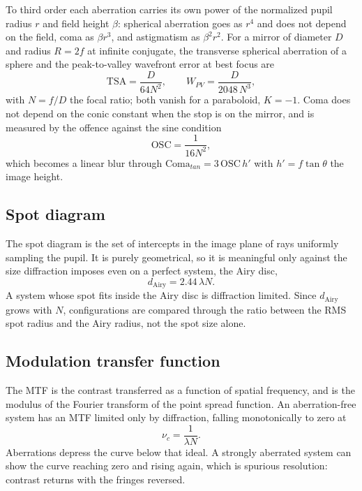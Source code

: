 \documentclass[conference]{IEEEtran}
\begin{document}
To third order each aberration carries its own power of the normalized pupil
radius $r$ and field height $\beta$: spherical aberration goes as $r^4$ and
does not depend on the field, coma as $\beta r^3$, and astigmatism as
$\beta^2r^2$. For a mirror of diameter $D$ and radius $R = 2f$ at infinite
conjugate, the transverse spherical aberration of a sphere and the
peak-to-valley wavefront error at best focus are
\begin{equation}
\mathrm{TSA} = \frac{D}{64N^2},
\qquad
W_{PV} = \frac{D}{2048\,N^3},
\label{eq:sa}
\end{equation}
with $N = f/D$ the focal ratio; both vanish for a paraboloid, $K = -1$. Coma
does not depend on the conic constant when the stop is on the mirror, and is
measured by the offence against the sine condition
\begin{equation}
\mathrm{OSC} = \frac{1}{16N^2},
\label{eq:osc}
\end{equation}
which becomes a linear blur through $\mathrm{Coma}_{tan} = 3\,\mathrm{OSC}\,h'$
with $h' = f\tan\theta$ the image height.

\subsection{Spot diagram}

The spot diagram is the set of intercepts in the image plane of rays
uniformly sampling the pupil. It is purely geometrical, so it is meaningful
only against the size diffraction imposes even on a perfect system, the Airy
disc,
\begin{equation}
d_{\mathrm{Airy}} = 2.44\,\lambda N.
\label{eq:airy}
\end{equation}
A system whose spot fits inside the Airy disc is diffraction limited. Since
$d_{\mathrm{Airy}}$ grows with $N$, configurations are compared through the
ratio between the RMS spot radius and the Airy radius, not the spot size
alone.

\subsection{Modulation transfer function}

The MTF is the contrast transferred as a function of spatial frequency, and
is the modulus of the Fourier transform of the point spread function. An
aberration-free system has an MTF limited only by diffraction, falling
monotonically to zero at
\begin{equation}
\nu_c = \frac{1}{\lambda N}.
\label{eq:cutoff}
\end{equation}
Aberrations depress the curve below that ideal. A strongly aberrated system
can show the curve reaching zero and rising again, which is spurious
resolution: contrast returns with the fringes reversed.
\end{document}
